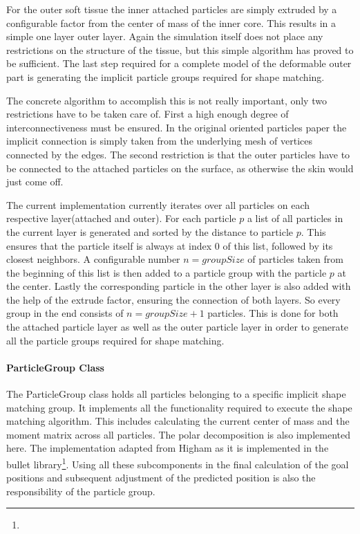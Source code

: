 For the outer soft tissue the inner attached particles are simply extruded by a configurable factor from the center of mass of the inner core. This results in a simple one layer outer layer. Again the simulation itself does not place any restrictions on the structure of the tissue, but this simple algorithm has proved to be sufficient. The last step required for a complete model of the deformable outer part is generating the implicit particle groups required for shape matching.

The concrete algorithm to accomplish this is not really important, only two restrictions have to be taken care of. First a high enough degree of interconnectiveness must be ensured. In the original oriented particles paper the implicit connection is simply taken from the underlying mesh of vertices connected by the edges. The second restriction is that the outer particles have to be connected to the attached particles on the surface, as otherwise the skin would just come off.

The current implementation currently iterates over all particles on each respective layer(attached and outer). For each particle $p$ a list of all particles in the current layer is generated and sorted by the distance to particle $p$. This ensures that the particle itself is always at index $0$ of this list, followed by its closest neighbors. A configurable number $n = groupSize$ of particles taken from the beginning of this list is then added to a particle group with the particle $p$ at the center. Lastly the corresponding particle in the other layer is also added with the help of the extrude factor, ensuring the connection of both layers. So every group in the end consists of $n = groupSize + 1$ particles. This is done for both the attached particle layer as well as the outer particle layer in order to generate all the particle groups required for shape matching.

\paragraph{ParticleGroup Class}
The ParticleGroup class holds all particles belonging to a specific implicit shape matching group. It implements all the functionality required to execute the shape matching algorithm. This includes calculating the current center of mass and the moment matrix across all particles. The polar decomposition is also implemented here. The implementation adapted from Higham \cite{Higham:1986vx} as it is implemented in the bullet library\footnote{}. Using all these subcomponents in the final calculation of the goal positions and subsequent adjustment of the predicted position is also the responsibility of the particle group.

